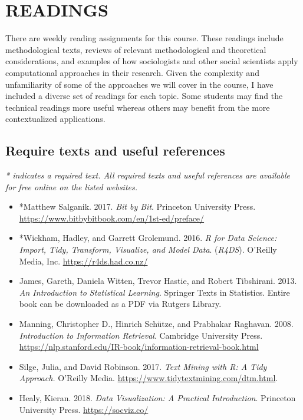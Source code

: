 \documentclass[
  10pt,
]{article}
\providecommand{\tightlist}{%
  \setlength{\itemsep}{0pt}\setlength{\parskip}{0pt}}
\begin{document}
\hypertarget{readings}{%
\section{READINGS}\label{readings}}

There are weekly reading assignments for this course. These readings
include methodological texts, reviews of relevant methodological and
theoretical considerations, and examples of how sociologists and other
social scientists apply computational approaches in their research.
Given the complexity and unfamiliarity of some of the approaches we will
cover in the course, I have included a diverse set of readings for each
topic. Some students may find the technical readings more useful whereas
others may benefit from the more contextualized applications.

\hypertarget{require-texts-and-useful-references}{%
\subsection{Require texts and useful
references}\label{require-texts-and-useful-references}}

\emph{* indicates a required text. All required texts and useful
references are available for free online on the listed websites.}

\begin{itemize}
\tightlist
\item
  *Matthew Salganik. 2017. \emph{Bit by Bit}. Princeton University
  Press. \url{https://www.bitbybitbook.com/en/1st-ed/preface/}
\item
  *Wickham, Hadley, and Garrett Grolemund. 2016. \emph{R for Data
  Science: Import, Tidy, Transform, Visualize, and Model Data}.
  (\emph{R4DS}). O'Reilly Media, Inc. \url{https://r4ds.had.co.nz/}
\item
  James, Gareth, Daniela Witten, Trevor Hastie, and Robert Tibshirani.
  2013. \emph{An Introduction to Statistical Learning}. Springer Texts
  in Statistics. Entire book can be downloaded as a PDF via Rutgers
  Library.
\item
  Manning, Christopher D., Hinrich Schütze, and Prabhakar Raghavan.
  2008. \emph{Introduction to Information Retrieval}. Cambridge
  University Press.
  \url{https://nlp.stanford.edu/IR-book/information-retrieval-book.html}
\item
  Silge, Julia, and David Robinson. 2017. \emph{Text Mining with R: A
  Tidy Approach.} O'Reilly Media.
  \url{https://www.tidytextmining.com/dtm.html}.
\item
  Healy, Kieran. 2018. \emph{Data Visualization: A Practical
  Introduction}. Princeton University Press. \url{https://socviz.co/}
\end{itemize}
\end{document}
